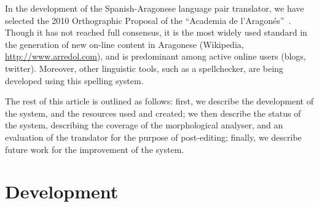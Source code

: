 \documentclass[10pt, a4paper]{article}
\begin{document}
  In the development of the Spanish-Aragonese language pair translator, we have selected the 2010 Orthographic Proposal of the ``Academia de l'Aragonés''~\cite{EFA}. Though it has not reached full consensus, it is the most widely used standard in the generation of new on-line content in Aragonese (Wikipedia, \url{http://www.arredol.com}), and is predominant among active online users (blogs, twitter). Moreover, other linguistic tools, such as a spellchecker, are being developed using this spelling system. %
  








  The rest of this article is outlined as follows: first, we describe the development of the system, and the resources used and created; we then describe the status of the system, describing the coverage of the morphological analyser, and an evaluation of the translator for the purpose of post-editing; finally, we describe future work for the improvement of the system.
  
  \section{Development}
  
\end{document}
